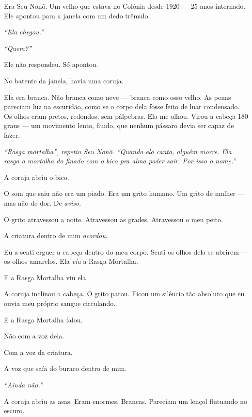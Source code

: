 \noindent Era Seu Nonô. Um velho que estava no Colônia desde 1920 --- 25 anos internado. Ele apontou para a janela com um dedo trêmulo.

\noindent \textit{\textquotedblleft{}Ela chegou.\textquotedblright{}}

\noindent \textit{\textquotedblleft{}Quem?\textquotedblright{}}

\noindent Ele não respondeu. Só apontou.

\noindent No batente da janela, havia uma coruja.

\noindent Ela era branca. Não branca como neve --- branca como osso velho. As penas pareciam luz na escuridão, como se o corpo dela fosse feito de luar condensado. Os olhos eram pretos, redondos, sem pálpebras. Ela me olhou. Virou a cabeça 180 graus --- um movimento lento, fluido, que nenhum pássaro devia ser capaz de fazer.

\noindent \textit{\textquotedblleft{}Rasga mortalha\textquotedblright{}\textit{, repetiu Seu Nonô. }\textquotedblleft{}Quando ela canta, alguém morre. Ela rasga a mortalha do finado com o bico pra alma poder sair. Por isso o nome.\textquotedblright{}}

\noindent A coruja abriu o bico.

\noindent O som que saiu não era um piado.
Era um grito humano.
Um grito de mulher --- mas não de dor.
De \textit{aviso}.

\noindent O grito atravessou a noite. Atravessou as grades. Atravessou o meu peito.

\noindent A criatura dentro de mim \textit{acordou}.

\noindent Eu a senti erguer a cabeça dentro do meu corpo. Senti os olhos dela se abrirem --- os olhos amarelos. Ela \textit{viu} a Rasga Mortalha.

\noindent E a Rasga Mortalha viu ela.

\noindent A coruja inclinou a cabeça. O grito parou. Ficou um silêncio tão absoluto que eu ouvia meu próprio sangue circulando.

\noindent E a Rasga Mortalha falou.

\noindent Não com a voz dela.

\noindent Com a voz da criatura.

\noindent A voz que saía do buraco dentro de mim.

\noindent \textit{\textquotedblleft{}Ainda não.\textquotedblright{}}

\noindent A coruja abriu as asas. Eram enormes. Brancas. Pareciam um lençol flutuando no escuro.

